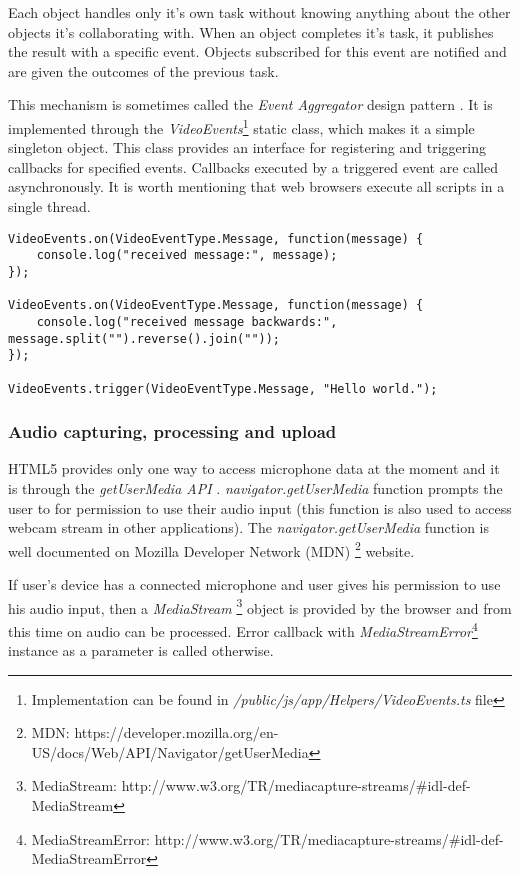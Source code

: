 Each object handles only it's own task without knowing anything about the other objects it's collaborating with. When an object completes it's task, it publishes the result with a specific event. Objects subscribed for this event are notified and are given the outcomes of the previous task.

This mechanism is sometimes called the \textit{Event Aggregator} design pattern \cite{}. It is implemented through the \textit{VideoEvents}\footnote{Implementation can be found in \textit{/public/js/app/Helpers/VideoEvents.ts} file} static class, which makes it a simple singleton object. This class provides an interface for registering and triggering callbacks for specified events. Callbacks executed by a triggered event are called asynchronously. It is worth mentioning that web browsers execute all scripts in a single thread.

\begin{lstlisting}
VideoEvents.on(VideoEventType.Message, function(message) {
	console.log("received message:", message);
});

VideoEvents.on(VideoEventType.Message, function(message) {
	console.log("received message backwards:", message.split("").reverse().join(""));
});

VideoEvents.trigger(VideoEventType.Message, "Hello world.");
\end{lstlisting}



\subsubsection{Audio capturing, processing and upload}

HTML5 provides only one way to access microphone data at the moment and it is through the \textit{getUserMedia API} \cite{get_user_media}. \textit{navigator.getUserMedia} function prompts the user to for permission to use their audio input (this function is also used to access webcam stream in other applications). The \textit{navigator.getUserMedia} function is well documented on Mozilla Developer Network (MDN) \footnote{MDN: https://developer.mozilla.org/en-US/docs/Web/API/Navigator/getUserMedia} website.

If user's device has a connected microphone and user gives his permission to use his audio input, then a \textit{MediaStream} \footnote{MediaStream: http://www.w3.org/TR/mediacapture-streams/\#idl-def-MediaStream} object is provided by the browser and from this time on audio can be processed. Error callback with \textit{MediaStreamError}\footnote{MediaStreamError: http://www.w3.org/TR/mediacapture-streams/\#idl-def-MediaStreamError} instance as a parameter is called otherwise.

